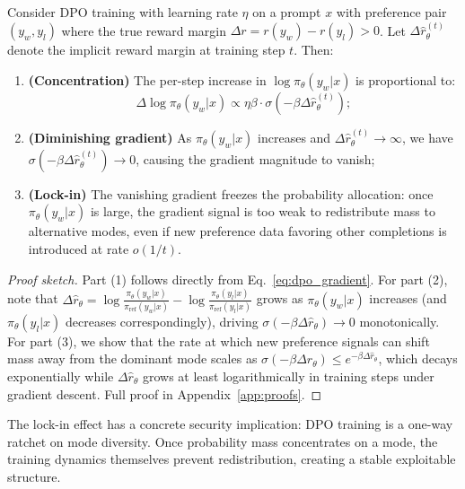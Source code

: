 \begin{proposition}
\label{prop:gradient_lockin}
Consider DPO training with learning rate $\eta$ on a prompt $x$ with preference pair $(y_w, y_l)$ where the true reward margin $\Delta r = r(y_w) - r(y_l) > 0$. Let $\Delta\hat{r}_\theta^{(t)}$ denote the implicit reward margin at training step $t$. Then:
\begin{enumerate}[leftmargin=*,itemsep=2pt]
    \item \textbf{(Concentration)} The per-step increase in $\log \pi_\theta(y_w|x)$ is proportional to:
    \begin{equation}
    \label{eq:concentration}
    \Delta \log \pi_\theta(y_w|x) \propto \eta \beta \cdot \sigma(-\beta \Delta\hat{r}_\theta^{(t)});
    \end{equation}
    \item \textbf{(Diminishing gradient)} As $\pi_\theta(y_w|x)$ increases and $\Delta\hat{r}_\theta^{(t)} \to \infty$, we have $\sigma(-\beta \Delta\hat{r}_\theta^{(t)}) \to 0$, causing the gradient magnitude to vanish;
    \item \textbf{(Lock-in)} The vanishing gradient freezes the probability allocation: once $\pi_\theta(y_w|x)$ is large, the gradient signal is too weak to redistribute mass to alternative modes, even if new preference data favoring other completions is introduced at rate $o(1/t)$.
\end{enumerate}
\end{proposition}
\begin{proof}[Proof sketch]
Part (1) follows directly from Eq.~\eqref{eq:dpo_gradient}. For part (2), note that $\Delta\hat{r}_\theta = \log\frac{\pi_\theta(y_w|x)}{\pi_{\text{ref}}(y_w|x)} - \log\frac{\pi_\theta(y_l|x)}{\pi_{\text{ref}}(y_l|x)}$ grows as $\pi_\theta(y_w|x)$ increases (and $\pi_\theta(y_l|x)$ decreases correspondingly), driving $\sigma(-\beta\Delta\hat{r}_\theta) \to 0$ monotonically. For part (3), we show that the rate at which new preference signals can shift mass away from the dominant mode scales as $\sigma(-\beta\Delta\hat{r}_\theta) \leq e^{-\beta\Delta\hat{r}_\theta}$, which decays exponentially while $\Delta\hat{r}_\theta$ grows at least logarithmically in training steps under gradient descent. Full proof in Appendix~\ref{app:proofs}.
\end{proof}

The lock-in effect has a concrete security implication: DPO training is a one-way ratchet on mode diversity. Once probability mass concentrates on a mode, the training dynamics themselves prevent redistribution, creating a stable exploitable structure.


